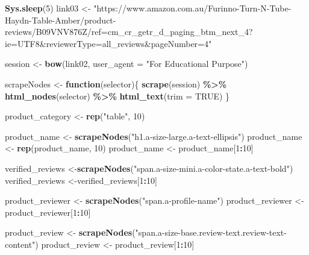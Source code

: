 \documentclass[
]{article}
\newenvironment{Shaded}{\begin{snugshade}}{\end{snugshade}}
\newcommand{\AttributeTok}[1]{\textcolor[rgb]{0.13,0.29,0.53}{#1}}
\newcommand{\ConstantTok}[1]{\textcolor[rgb]{0.56,0.35,0.01}{#1}}
\newcommand{\ControlFlowTok}[1]{\textcolor[rgb]{0.13,0.29,0.53}{\textbf{#1}}}
\newcommand{\DecValTok}[1]{\textcolor[rgb]{0.00,0.00,0.81}{#1}}
\newcommand{\FunctionTok}[1]{\textcolor[rgb]{0.13,0.29,0.53}{\textbf{#1}}}
\newcommand{\NormalTok}[1]{#1}
\newcommand{\OtherTok}[1]{\textcolor[rgb]{0.56,0.35,0.01}{#1}}
\newcommand{\SpecialCharTok}[1]{\textcolor[rgb]{0.81,0.36,0.00}{\textbf{#1}}}
\newcommand{\StringTok}[1]{\textcolor[rgb]{0.31,0.60,0.02}{#1}}
\begin{document}
\begin{Shaded}
\begin{Highlighting}[]
   \FunctionTok{Sys.sleep}\NormalTok{(}\DecValTok{5}\NormalTok{)}
\NormalTok{link03 }\OtherTok{\textless{}{-}} \StringTok{"https://www.amazon.com.au/Furinno{-}Turn{-}N{-}Tube{-}Haydn{-}Table{-}Amber/product{-}reviews/B09VNV876Z/ref=cm\_cr\_getr\_d\_paging\_btm\_next\_4?ie=UTF8\&reviewerType=all\_reviews\&pageNumber=4"}


\NormalTok{  session }\OtherTok{\textless{}{-}} \FunctionTok{bow}\NormalTok{(link02,}
               \AttributeTok{user\_agent =} \StringTok{"For Educational Purpose"}\NormalTok{)}

\NormalTok{  scrapeNodes }\OtherTok{\textless{}{-}} \ControlFlowTok{function}\NormalTok{(selector)\{}
    \FunctionTok{scrape}\NormalTok{(session) }\SpecialCharTok{\%\textgreater{}\%}
      \FunctionTok{html\_nodes}\NormalTok{(selector) }\SpecialCharTok{\%\textgreater{}\%}
      \FunctionTok{html\_text}\NormalTok{(}\AttributeTok{trim =} \ConstantTok{TRUE}\NormalTok{)}
\NormalTok{  \}}

\NormalTok{  product\_category }\OtherTok{\textless{}{-}} \FunctionTok{rep}\NormalTok{(}\StringTok{"table"}\NormalTok{, }\DecValTok{10}\NormalTok{)}

\NormalTok{  product\_name }\OtherTok{\textless{}{-}} \FunctionTok{scrapeNodes}\NormalTok{(}\StringTok{"h1.a{-}size{-}large.a{-}text{-}ellipsis"}\NormalTok{)}
\NormalTok{  product\_name }\OtherTok{\textless{}{-}} \FunctionTok{rep}\NormalTok{(product\_name, }\DecValTok{10}\NormalTok{)}
\NormalTok{  product\_name }\OtherTok{\textless{}{-}}\NormalTok{ product\_name[}\DecValTok{1}\SpecialCharTok{:}\DecValTok{10}\NormalTok{]}
  
\NormalTok{  verified\_reviews }\OtherTok{\textless{}{-}}\FunctionTok{scrapeNodes}\NormalTok{(}\StringTok{"span.a{-}size{-}mini.a{-}color{-}state.a{-}text{-}bold"}\NormalTok{)}
\NormalTok{  verified\_reviews }\OtherTok{\textless{}{-}}\NormalTok{verified\_reviews[}\DecValTok{1}\SpecialCharTok{:}\DecValTok{10}\NormalTok{]}
  
\NormalTok{  product\_reviewer }\OtherTok{\textless{}{-}} \FunctionTok{scrapeNodes}\NormalTok{(}\StringTok{"span.a{-}profile{-}name"}\NormalTok{)}
\NormalTok{  product\_reviewer }\OtherTok{\textless{}{-}}\NormalTok{ product\_reviewer[}\DecValTok{1}\SpecialCharTok{:}\DecValTok{10}\NormalTok{]}
  
\NormalTok{  product\_review }\OtherTok{\textless{}{-}} \FunctionTok{scrapeNodes}\NormalTok{(}\StringTok{"span.a{-}size{-}base.review{-}text.review{-}text{-}content"}\NormalTok{)}
\NormalTok{  product\_review }\OtherTok{\textless{}{-}}\NormalTok{ product\_review[}\DecValTok{1}\SpecialCharTok{:}\DecValTok{10}\NormalTok{]}
  

\end{Highlighting}
\end{Shaded}
\end{document}
